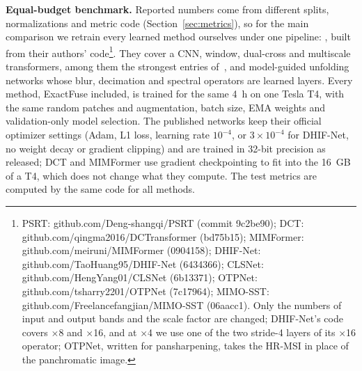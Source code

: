 \documentclass[journal]{IEEEtran}
\begin{document}
\textbf{Equal-budget benchmark.} Reported numbers come from different splits, normalizations and metric code (Section~\ref{sec:metrics}), so for the main comparison we retrain every learned method ourselves under one pipeline: , built from their authors' code\footnote{PSRT: github.com/Deng-shangqi/PSRT (commit 9c2be90); DCT: github.com/qingma2016/DCTransformer (bd75b15); MIMFormer: github.com/meiruni/MIMFormer (0904158); DHIF-Net: github.com/TaoHuang95/DHIF-Net (6434366); CLSNet: github.com/HengYang01/CLSNet (6b13371); OTPNet: github.com/tsharry2201/OTPNet (7c17964); MIMO-SST: github.com/Freelancefangjian/MIMO-SST (06aacc1). Only the numbers of input and output bands and the scale factor are changed; DHIF-Net's code covers $\times$8 and $\times$16, and at $\times$4 we use one of the two stride-4 layers of its $\times$16 operator; OTPNet, written for pansharpening, takes the HR-MSI in place of the panchromatic image.}. They cover a CNN, window, dual-cross and multiscale transformers, among them the strongest entries of~\cite{chen2026twostage}, and model-guided unfolding networks whose blur, decimation and spectral operators are learned layers. Every method, ExactFuse included, is trained for the same 4~h on one Tesla T4, with the same random patches and augmentation, batch size, EMA weights and validation-only model selection. The published networks keep their official optimizer settings (Adam, L1 loss, learning rate $10^{-4}$, or $3\times10^{-4}$ for DHIF-Net, no weight decay or gradient clipping) and are trained in 32-bit precision as released; DCT and MIMFormer use gradient checkpointing to fit into the 16~GB of a T4, which does not change what they compute. The test metrics are computed by the same code for all methods.
\end{document}
